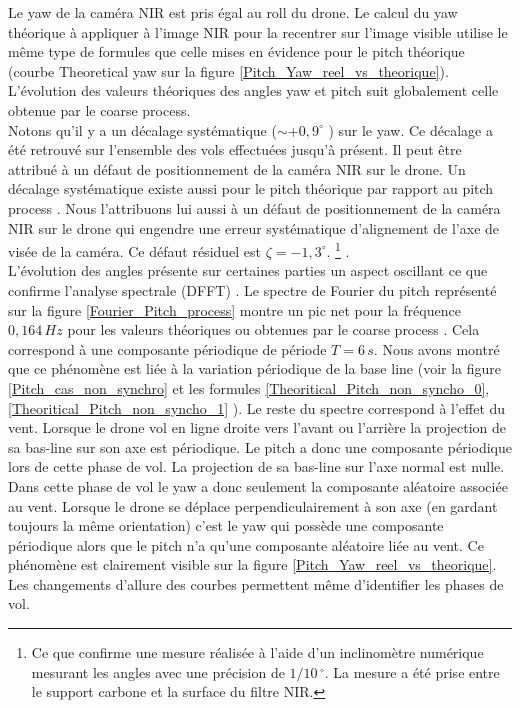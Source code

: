 \documentclass[a4paper,11pt]{report}
\begin{document}
Le yaw de la caméra NIR est pris égal au  roll du drone. 
Le calcul du yaw théorique à appliquer à l'image NIR pour la recentrer sur l'image visible utilise le même type de formules que celle mises en  évidence pour le pitch théorique (courbe \og Theoretical yaw \fg{} sur la figure \ref{Pitch_Yaw_reel_vs_theorique}). \\ 
L'évolution des valeurs théoriques des angles yaw et pitch suit globalement celle obtenue par le \og coarse process\fg{}.\\ 


Notons qu'il y  a un décalage systématique ($\sim +0,9^\circ$ ) sur le yaw. Ce décalage a été retrouvé sur l'ensemble des vols effectuées jusqu'à présent. Il peut être attribué à un défaut de positionnement de la caméra NIR sur le drone. Un décalage systématique existe aussi pour le pitch \og{}théorique \fg{} par rapport au pitch \og{} process \fg{}. Nous l'attribuons lui aussi à un défaut de positionnement de la caméra NIR sur le drone qui engendre une erreur systématique d'alignement de l'axe de visée de la caméra. Ce défaut résiduel est $\zeta = -1,3^\circ$.
\footnote{Ce que confirme une mesure réalisée à l'aide d'un inclinomètre numérique mesurant les angles avec une précision de $1/10\, ^\circ$. La mesure a été prise entre le support carbone et la surface du filtre NIR.} .\\

L'évolution des angles présente sur certaines parties un aspect oscillant ce que confirme l'analyse spectrale (DFFT) . 
Le spectre de Fourier du pitch représenté sur la figure \ref{Fourier_Pitch_process} montre  un pic net pour la fréquence $0,164\,Hz$ pour les valeurs théoriques ou obtenues par le  \og coarse process \fg{}.  
Cela correspond à une composante périodique de période $T=6\,s$. 
Nous avons montré que ce phénomène est liée à la variation périodique de la \og base line \fg{} (voir la figure \ref{Pitch_cas_non_synchro} et les formules  \eqref{Theoritical_Pitch_non_syncho_0}, \eqref{Theoritical_Pitch_non_syncho_1} ).
Le reste du spectre correspond à l'effet du vent.
Lorsque le drone vol en ligne droite vers l'avant ou l'arrière la projection de sa \og bas-line \fg{} sur son axe est périodique. 
Le pitch  a donc une composante périodique lors de cette phase de vol. 
La projection de sa \og bas-line \fg{} sur l'axe normal est nulle. 
Dans cette phase de vol le yaw a donc seulement la composante aléatoire associée au vent. 
Lorsque le drone se déplace perpendiculairement à son axe (en gardant toujours la même orientation) c'est le yaw qui possède une composante périodique alors que le pitch n'a qu'une composante aléatoire liée  au vent. 
Ce phénomène est clairement visible sur la figure \ref{Pitch_Yaw_reel_vs_theorique}. Les changements d'allure des courbes permettent même d'identifier les phases de vol.\\
\end{document}
